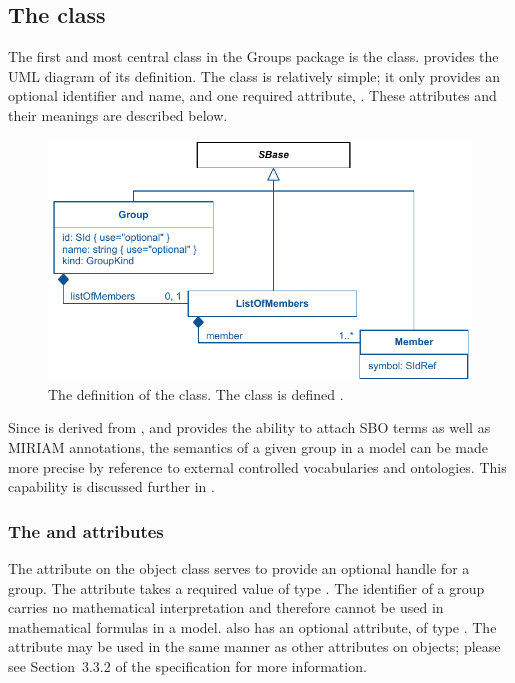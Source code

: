 \subsection{The  class}
\label{group-class}
\label{listofmembers-class}

The first and most central class in the Groups package is the \Group class.   provides the UML diagram of its definition.  The \Group class is relatively simple; it only provides an optional identifier and name, and one required attribute, .  These attributes and their meanings are described below.

\begin{figure}[bh]
  \includegraphics{figs/group-uml}
  \caption{The definition of the \Group class.  The \Member class is defined .}
  \label{group-uml}
  \label{member-uml}
\end{figure}

Since \Group is derived from \SBase, and \SBase provides the ability to attach SBO terms as well as MIRIAM annotations, the semantics of a given group in a model can be made more precise by reference to external controlled vocabularies and ontologies.  This capability is discussed further in .


\subsubsection{The \fixttspace{} and \fixttspace{} attributes}

The  attribute on the \Group object class serves to provide an optional handle for a group.  The attribute takes a required value of type .  The identifier of a group carries no mathematical interpretation and therefore cannot be used in mathematical formulas in a model.  \Group also has an optional  attribute, of type .  The  attribute may be used in the same manner as other  attributes on \sbmlthreecore objects; please see Section~3.3.2 of the \sbmlthreecore specification for more information.


